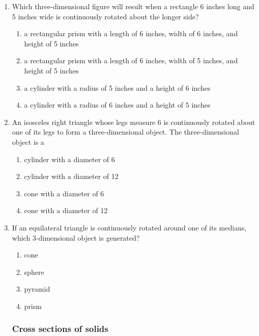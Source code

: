 \documentclass[12pt, twoside]{article}
\begin{document}
\begin{enumerate}
  \item %
  Which three-dimensional figure will result when a rectangle 6 inches long and 5 inches wide is continuously rotated about the longer side?
    \begin{enumerate}
      \item a rectangular prism with a length of 6 inches, width of 6 inches, and height of 5 inches
      \item a rectangular prism with a length of 6 inches, width of 5 inches, and height of 5 inches
      \item a cylinder with a radius of 5 inches and a height of 6 inches
      \item a cylinder with a radius of 6 inches and a height of 5 inches
    \end{enumerate}

  \item %
  An isosceles right triangle whose legs measure 6 is continuously rotated about one of its legs to form a three-dimensional object. The three-dimensional object is a
    \begin{enumerate}
      \item cylinder with a diameter of 6
      \item cylinder with a diameter of 12
      \item cone with a diameter of 6
      \item cone with a diameter of 12
    \end{enumerate}

  \item If an equilateral triangle is continuously rotated around one of its medians, which 3-dimensional object is generated?
    \begin{enumerate}
      \item cone
      \item sphere
      \item pyramid
      \item prism
    \end{enumerate}

\newpage
  \subsubsection*{Cross sections of solids} %


\end{enumerate}
\end{document}
